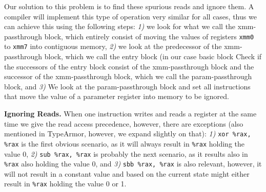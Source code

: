 Our solution to this problem is to find these spurious reads and ignore them. A compiler will implement this type of operation very 
similar for all cases, thus we can achieve this using the following steps:
\textit{1)} we look for what we call the xmm-passthrough block, which entirely consist of moving the values of registers \texttt{xmm0} to 
\texttt{xmm7} into contiguous memory, %
\textit{2)} we look at the predecessor of the xmm-passthrough block, which we call the entry block (in our case basic block %
Check if the successors of the entry block consist of the xmm-passthrough block and the successor of the 
xmm-passthrough block, which we call the param-passthrough block, and
\textit{3)} We look at the param-passthrough block and set all instructions that move the value of a parameter register into memory to be
ignored. %

\textbf{Ignoring Reads.} When one instruction writes and reads a register at the same time we give the read access precedence, however, there are exceptions 
(also mentioned in TypeArmor, however, we expand slightly on that):
\textit{1)} \texttt{xor \%rax, \%rax} is the first obvious scenario, as it will always result in \texttt{\%rax} holding the value 0,
\textit{2)} \texttt{sub \%rax, \%rax} is probably the next scenario, as it results also in \texttt{\%rax} also holding the value 0, and
\textit{3)} \texttt{sbb \%rax, \%rax} is also relevant, however, it will not result in a constant value and based on the current state might either 
result in \texttt{\%rax} holding the value 0 or 1.

